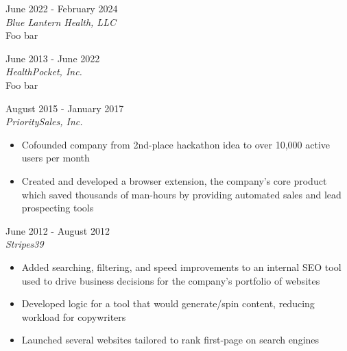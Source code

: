 \documentclass{resume}
\begin{document}
\begin{spacing}{1.2}
\begin{paracol}{2}
\begin{flushright}
		\bigskip
		\bigskip

		\small {}

		\medskip


	\end{flushright}

	\switchcolumn
	\small {}

	\medskip
	
	{\large{}}
	\hfill{June 2022 - February 2024}\\
	\textit{Blue Lantern Health, LLC}\\
	Foo bar

	\medskip

	{\large{}}
	\hfill{June 2013 - June 2022}\\
	\textit{HealthPocket, Inc.}\\
	Foo bar

	\medskip

	{\large{}}
	\hfill{August 2015 - January 2017}\\
	\textit{PrioritySales, Inc.}

	\nointerlineskip
	\begin{itemize}
		\item Cofounded company from 2nd-place hackathon idea to over 10,000 active users per month
		\item Created and developed a browser extension, the company’s core product which saved thousands of man-hours by providing automated sales and lead prospecting tools
	\end{itemize}

	\medskip

	{\large{}}
	\hfill{June 2012 - August 2012}\\
	\textit{Stripes39}

	\nointerlineskip
	\begin{itemize}
		\item Added searching, filtering, and speed improvements to an internal SEO tool used to drive business decisions for the company’s portfolio of websites
		\item Developed logic for a tool that would generate/spin content, reducing workload for copywriters
		\item Launched several websites tailored to rank first-page on search engines
	\end{itemize}


\end{paracol}
\end{spacing}
\end{document}
